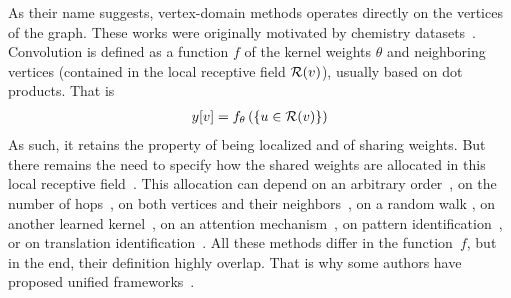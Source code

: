 As their name suggests, vertex-domain methods operates directly on the vertices of the graph. These works were originally motivated by chemistry datasets~\citep{duvenaud2015convolutional,kearnes2016molecular}. Convolution is defined as a function $f$ of the kernel weights $\theta$ and neighboring vertices (contained in the local receptive field $\mathcal{R}(v)$), usually based on dot products. That is
\begin{gather}
y[v] = f_\theta\left(\{u \in \mathcal{R}(v)\}\right)
\end{gather}
As such, it retains the property of being localized and of sharing weights. But there remains the need to specify how the shared weights are allocated in this local receptive field~\citep{vialatte2016generalizing}. This allocation can depend on \eg an arbitrary order~\citep{niepert2016learning}, on the number of hops~\citep{atwood2016diffusion,du2017topology}, on both vertices and their neighbors~\citep{monti2016geometric,simonovsky2017dynamic}, on a random walk \citep{hechtlinger2017generalization}, on another learned kernel~\citep{vialatte2017learning}, on an attention mechanism~\citep{velickovic2017graph,lee2018attention}, on pattern identification~\citep{sankar2017motif}, or on translation identification~\citep{pasdeloup2017convolutional}. All these methods differ in the function~$f$, but in the end, their definition highly overlap. That is why some authors have proposed unified frameworks~\citep{gilmer2017neural}.

